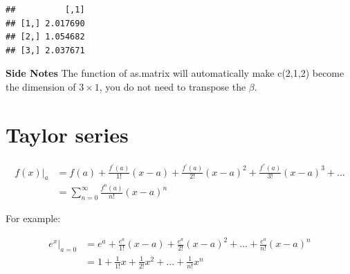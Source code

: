 \documentclass[]{book}
\newenvironment{Shaded}{\begin{snugshade}}{\end{snugshade}}
\newcommand{\CommentTok}[1]{\textcolor[rgb]{0.56,0.35,0.01}{\textit{#1}}}
\newcommand{\DataTypeTok}[1]{\textcolor[rgb]{0.13,0.29,0.53}{#1}}
\newcommand{\DecValTok}[1]{\textcolor[rgb]{0.00,0.00,0.81}{#1}}
\newcommand{\KeywordTok}[1]{\textcolor[rgb]{0.13,0.29,0.53}{\textbf{#1}}}
\newcommand{\NormalTok}[1]{#1}
\newcommand{\OperatorTok}[1]{\textcolor[rgb]{0.81,0.36,0.00}{\textbf{#1}}}
\begin{document}
\begin{Shaded}
\end{Shaded}

\begin{verbatim}
##          [,1]
## [1,] 2.017690
## [2,] 1.054682
## [3,] 2.037671
\end{verbatim}

\textbf{Side Notes}
The function of as.matrix will automatically make c(2,1,2) become the dimension of \(3 \times 1\), you do not need to transpose the \(\beta\).

\hypertarget{taylor-series}{%
\section{Taylor series}\label{taylor-series}}

\[\begin{aligned}
f(x)|_{a} &=f(a)+\frac{f^{'}(a)}{1!}(x-a)+\frac{f^{'}(a)}{2!}(x-a)^2+\frac{f^{''}(a)}{3!}(x-a)^{3}+...\\&=\sum_{n=0}^{\infty} \frac{f^{n}(a)}{n!}(x-a)^n 
\end{aligned}\]

For example:

\[\begin{aligned} 
e^x |_{a=0} &= e^a+ \frac{e^a}{1!}(x-a)+\frac{e^a}{2!}(x-a)^2+...+\frac{e^a}{n!}(x-a)^n \\ 
&=  1+ \frac{1}{1!}x+\frac{1}{2!}x^2+...+\frac{1}{n!}x^n
\end{aligned}\]
\end{document}
